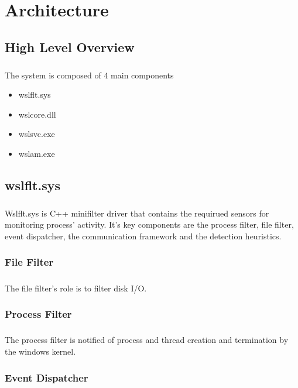 \chapter{Architecture}
    \section{High Level Overview}
        \paragraph{}
        The system is composed of 4 main components
        \begin{itemize}
            \item wslflt.sys
            \item wslcore.dll
            \item wslsvc.exe
            \item wslam.exe
        \end{itemize}
    \section{wslflt.sys}
        \paragraph{}
        Wslflt.sys is C++ minifilter driver that contains the requirued sensors for monitoring process' activity. It's key components are the
        process filter, file filter, event dispatcher, the communication framework and the detection heuristics.
        \subsection{File Filter}
            \paragraph{}
            The file filter's role is to filter disk I/O.
        \subsection{Process Filter}
            \paragraph{}
            The process filter is notified of process and thread creation and termination by the windows kernel.
        \subsection{Event Dispatcher}
